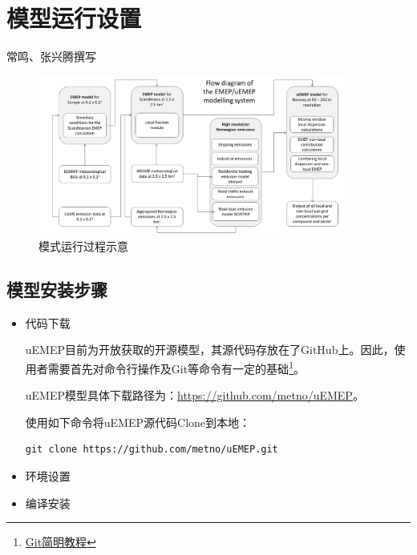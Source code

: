 \documentclass{article}
\begin{document}
\section{模型运行设置}

{\color{red} 常鸣、张兴腾撰写}

\begin{figure}[H]
\includegraphics[width=0.9\textwidth]{emepuemepflow.png}
\centering\caption{模式运行过程示意}\label{emepuemepflow}
\end{figure}

\subsection{模型安装步骤}

\begin{itemize}

\item 代码下载

uEMEP目前为开放获取的开源模型，其源代码存放在了GitHub上。因此，使用者需要首先对命令行操作及Git等命令有一定的基础\footnote{\href{https://www.liaoxuefeng.com/wiki/896043488029600}{Git简明教程}}。

uEMEP模型具体下载路径为：\url{https://github.com/metno/uEMEP}。

使用如下命令将uEMEP源代码Clone到本地：

\begin{lstlisting}[language={[ANSI]C},keywordstyle=\color{blue!70},commentstyle=\color{red!50!green!50!blue!50},frame=shadowbox, rulesepcolor=\color{red!20!green!20!blue!20}]
git clone https://github.com/metno/uEMEP.git
\end{lstlisting}

\item 环境设置

\item 编译安装

\end{itemize}
\end{document}
